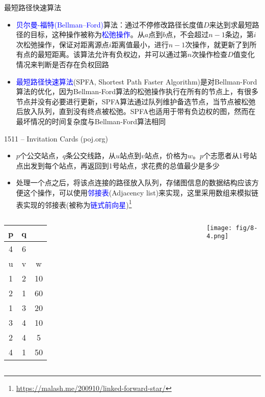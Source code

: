 \begin{frame}{最短路径快速算法}
    \begin{itemize}
        \item \textcolor{blue}{贝尔曼-福特(Bellman–Ford)}算法：通过不停修改路径长度值$D$来达到求最短路径的目标，这种操作被称为\textcolor{blue}{松弛操作}。从$a$点到$b$点，不会超过$n-1$条边，第$i$次松弛操作，保证对距离源点$i$距离值最小，进行$n-1$次操作，就更新了到所有点的最短距离。该算法允许有负权边，并可以通过第$n$次操作检查$D$值变化情况来判断是否存在负权回路
        \vfill
        \item \textcolor{blue}{最短路径快速算法}(SPFA, Shortest Path Faster Algorithm)是对Bellman-Ford算法的优化，因为Bellman-Ford算法的松弛操作执行在所有的节点上，有很多节点并没有必要进行更新，SPFA算法通过队列维护备选节点，当节点被松弛后放入队列，直到没有终点被松弛。SPFA也适用于带有负边权的图，然而在最坏情况的时间复杂度与Bellman-Ford算法相同
\end{itemize}
\end{frame}
\begin{frame}{1511 -- Invitation Cards (poj.org)}
    \begin{itemize}
        \item $p$个公交站点，$q$条公交线路，从$u$站点到$v$站点，价格为$w$。$p$个志愿者从1号站点出发到每个站点，再返回到1号站点，求花费的总值最少是多少
        \item 处理一个点之后，将该点连接的路径放入队列，存储图信息的数据结构应该方便这个操作，可以使用\textcolor{blue}{邻接表}(Adjacency list)来实现，这里采用数组来模拟链表实现的邻接表(被称为\textcolor{blue}{链式前向星})\footnote{\url{https://malash.me/200910/linked-forward-star/}}
\end{itemize}
\begin{columns}   
        \begin{table}
            \scriptsize{
            \begin{tabular}{ccc}
                p  & q    \\\hline
                4  & 6    \\\hline
                u  & v  &  w   \\\hline
                1  & 2  & 10   \\\hline
                2  & 1  & 60   \\\hline
                1  & 3  & 20   \\\hline
                3  & 4  & 10   \\\hline
                2  & 4  & 5    \\\hline
                4  & 1  & 50   \\\hline
            \end{tabular}
            }
        \end{table}
        \texttt{[image: fig/8-4.png]}
\end{columns}
\end{frame}
